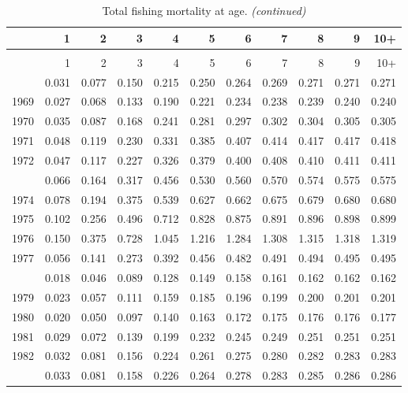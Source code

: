 \documentclass[
]{article}
\begin{document}
\begin{longtable}[t]{lrrrrrrrrrr}
\caption{\label{tab:FAA-tot-table}Total fishing mortality at age.}\\
\toprule
  & 1 & 2 & 3 & 4 & 5 & 6 & 7 & 8 & 9 & 10+\\
\midrule
\endfirsthead
\caption[]{Total fishing mortality at age. \textit{(continued)}}\\
\toprule
  & 1 & 2 & 3 & 4 & 5 & 6 & 7 & 8 & 9 & 10+\\
\midrule
\endhead

\endfoot
\bottomrule
\endlastfoot
1968 & 0.031 & 0.077 & 0.150 & 0.215 & 0.250 & 0.264 & 0.269 & 0.271 & 0.271 & 0.271\\
1969 & 0.027 & 0.068 & 0.133 & 0.190 & 0.221 & 0.234 & 0.238 & 0.239 & 0.240 & 0.240\\
1970 & 0.035 & 0.087 & 0.168 & 0.241 & 0.281 & 0.297 & 0.302 & 0.304 & 0.305 & 0.305\\
1971 & 0.048 & 0.119 & 0.230 & 0.331 & 0.385 & 0.407 & 0.414 & 0.417 & 0.417 & 0.418\\
1972 & 0.047 & 0.117 & 0.227 & 0.326 & 0.379 & 0.400 & 0.408 & 0.410 & 0.411 & 0.411\\
\addlinespace
1973 & 0.066 & 0.164 & 0.317 & 0.456 & 0.530 & 0.560 & 0.570 & 0.574 & 0.575 & 0.575\\
1974 & 0.078 & 0.194 & 0.375 & 0.539 & 0.627 & 0.662 & 0.675 & 0.679 & 0.680 & 0.680\\
1975 & 0.102 & 0.256 & 0.496 & 0.712 & 0.828 & 0.875 & 0.891 & 0.896 & 0.898 & 0.899\\
1976 & 0.150 & 0.375 & 0.728 & 1.045 & 1.216 & 1.284 & 1.308 & 1.315 & 1.318 & 1.319\\
1977 & 0.056 & 0.141 & 0.273 & 0.392 & 0.456 & 0.482 & 0.491 & 0.494 & 0.495 & 0.495\\
\addlinespace
1978 & 0.018 & 0.046 & 0.089 & 0.128 & 0.149 & 0.158 & 0.161 & 0.162 & 0.162 & 0.162\\
1979 & 0.023 & 0.057 & 0.111 & 0.159 & 0.185 & 0.196 & 0.199 & 0.200 & 0.201 & 0.201\\
1980 & 0.020 & 0.050 & 0.097 & 0.140 & 0.163 & 0.172 & 0.175 & 0.176 & 0.176 & 0.177\\
1981 & 0.029 & 0.072 & 0.139 & 0.199 & 0.232 & 0.245 & 0.249 & 0.251 & 0.251 & 0.251\\
1982 & 0.032 & 0.081 & 0.156 & 0.224 & 0.261 & 0.275 & 0.280 & 0.282 & 0.283 & 0.283\\
\addlinespace
1983 & 0.033 & 0.081 & 0.158 & 0.226 & 0.264 & 0.278 & 0.283 & 0.285 & 0.286 & 0.286\\

\end{longtable}
\end{document}
